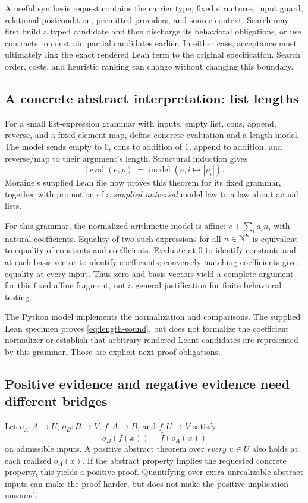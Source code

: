 \documentclass[11pt,letterpaper]{article}
\newcommand{\code}[1]{\texttt{\detokenize{#1}}}
\theoremstyle{definition}\newtheorem{definition}[proposition]{Definition}
\theoremstyle{remark}\newtheorem{remark}[proposition]{Remark}
\begin{document}
A useful synthesis request contains the carrier type, fixed structures,
input guard, relational postcondition, permitted providers, and source context.
Search may first build a typed candidate and then discharge its behavioral
obligations, or use contracts to constrain partial candidates earlier. In
either case, acceptance must ultimately link the exact rendered Lean term
to the original specification. Search order, costs, and heuristic ranking can
change without changing this boundary.

\subsection{A concrete abstract interpretation: list lengths}
For a small list-expression grammar with inputs, empty list, cons, append,
reverse, and a fixed element map, define concrete evaluation and a length model.
The model sends empty to $0$, cons to addition of $1$, append to addition,
and reverse/map to their argument's length. Structural induction gives
\begin{equation}\label{eq:length-sound}
 |\operatorname{eval}(e,\rho)|
 =\operatorname{model}(e,i\mapsto|\rho_i|).
\end{equation}
Moraine's supplied Lean file now proves this theorem for its fixed
\code{List Nat} grammar, together with promotion of a \emph{supplied universal}
model law to a law about actual lists.

For this grammar, the normalized arithmetic model is affine:
$c+\sum_i a_i n_i$ with natural coefficients. Equality of two such expressions
for all $n\in\mathbb N^k$ is equivalent to equality of constants and coefficients.
Evaluate at $0$ to identify constants and at each basis vector to identify
coefficients; conversely matching coefficients give equality at every input.
Thus zero and basis vectors yield a complete argument for this fixed affine
fragment, not a general justification for finite behavioral testing.

The Python model implements the normalization and comparisons. The supplied
Lean specimen proves \eqref{eq:length-sound}, but does not formalize the
coefficient normalizer or establish that arbitrary rendered Leant candidates
are represented by this grammar. Those are explicit next proof obligations.

\subsection{Positive evidence and negative evidence need different bridges}\label{sec:realization}
Let $o_A:A\to U$, $o_B:B\to V$, $f:A\to B$, and $\widehat f:U\to V$ satisfy
\[
 o_B(f(x))=\widehat f(o_A(x))
\]
on admissible inputs. A positive abstract theorem over \emph{every} $u\in U$
also holds at each realized $o_A(x)$. If the abstract property implies the
requested concrete property, this yields a positive proof. Quantifying over
extra unrealizable abstract inputs can make the proof harder, but does not
make the positive implication unsound.
\end{document}
